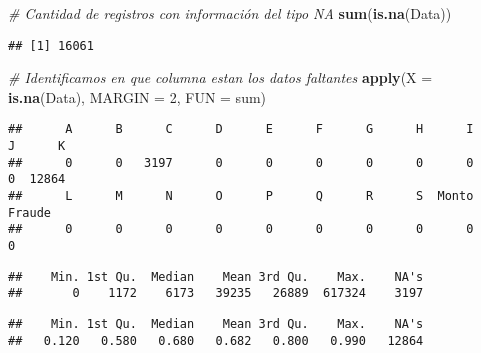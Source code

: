 \documentclass[]{article}
\newenvironment{Shaded}{\begin{snugshade}}{\end{snugshade}}
\newcommand{\CommentTok}[1]{\textcolor[rgb]{0.56,0.35,0.01}{\textit{#1}}}
\newcommand{\DataTypeTok}[1]{\textcolor[rgb]{0.13,0.29,0.53}{#1}}
\newcommand{\DecValTok}[1]{\textcolor[rgb]{0.00,0.00,0.81}{#1}}
\newcommand{\KeywordTok}[1]{\textcolor[rgb]{0.13,0.29,0.53}{\textbf{#1}}}
\newcommand{\NormalTok}[1]{#1}
\newcommand{\OperatorTok}[1]{\textcolor[rgb]{0.81,0.36,0.00}{\textbf{#1}}}
\begin{document}
\begin{Shaded}
\begin{Highlighting}[]
\CommentTok{# Cantidad de registros con información del tipo NA}
\KeywordTok{sum}\NormalTok{(}\KeywordTok{is.na}\NormalTok{(Data))}
\end{Highlighting}
\end{Shaded}

\begin{verbatim}
## [1] 16061
\end{verbatim}

\begin{Shaded}
\begin{Highlighting}[]
\CommentTok{# Identificamos en que columna estan los datos faltantes}
\KeywordTok{apply}\NormalTok{(}\DataTypeTok{X =} \KeywordTok{is.na}\NormalTok{(Data), }\DataTypeTok{MARGIN =} \DecValTok{2}\NormalTok{, }\DataTypeTok{FUN =}\NormalTok{ sum)}
\end{Highlighting}
\end{Shaded}

\begin{verbatim}
##      A      B      C      D      E      F      G      H      I      J      K 
##      0      0   3197      0      0      0      0      0      0      0  12864 
##      L      M      N      O      P      Q      R      S  Monto Fraude 
##      0      0      0      0      0      0      0      0      0      0
\end{verbatim}

\begin{Shaded}
\end{Shaded}

\begin{verbatim}
##    Min. 1st Qu.  Median    Mean 3rd Qu.    Max.    NA's 
##       0    1172    6173   39235   26889  617324    3197
\end{verbatim}

\begin{Shaded}
\end{Shaded}

\begin{verbatim}
##    Min. 1st Qu.  Median    Mean 3rd Qu.    Max.    NA's 
##   0.120   0.580   0.680   0.682   0.800   0.990   12864
\end{verbatim}
\end{document}
